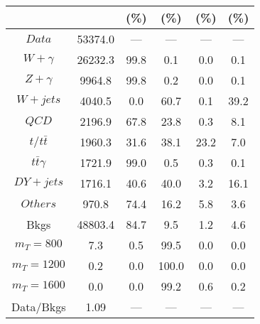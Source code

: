 \begin{figure}
\begin{minipage}[c]{0.32\textwidth}
{\begin{tabular}{cccccc}
 &  & (\%) & (\%) & (\%) & (\%)  \\
\hline
                                                                      $ Data $ &  53374.0 &  --- &  --- &  --- &  ---\\
$ W+\gamma $ &  26232.3 &  99.8 &  0.1 &  0.0 &  0.1\\
$ Z+\gamma $ &  9964.8 &  99.8 &  0.2 &  0.0 &  0.1\\
$ W+jets $ &  4040.5 &  0.0 &  60.7 &  0.1 &  39.2\\
$ QCD $ &  2196.9 &  67.8 &  23.8 &  0.3 &  8.1\\
$ t/t\bar{t} $ &  1960.3 &  31.6 &  38.1 &  23.2 &  7.0\\
$ t\bar{t}\gamma $ &  1721.9 &  99.0 &  0.5 &  0.3 &  0.1\\
$ DY+jets $ &  1716.1 &  40.6 &  40.0 &  3.2 &  16.1\\
$ Others $ &  970.8 &  74.4 &  16.2 &  5.8 &  3.6\\
Bkgs &  48803.4 &  84.7 &  9.5 &  1.2 &  4.6\\
$ m_{T} = 800 $ &  7.3 &  0.5 &  99.5 &  0.0 &  0.0\\
$ m_{T} = 1200 $ &  0.2 &  0.0 &  100.0 &  0.0 &  0.0\\
$ m_{T} = 1600 $ &  0.0 &  0.0 &  99.2 &  0.6 &  0.2\\
Data/Bkgs &  1.09 &  --- &  --- &  --- &  ---\\
\hline
\end{tabular}
}
\end{minipage}
\end{figure}

